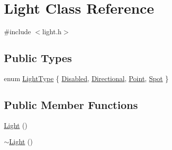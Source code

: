 \hypertarget{class_light}{}\section{Light Class Reference}
\label{class_light}


{\ttfamily \#include $<$light.\+h$>$}

\subsection*{Public Types}
\begin{DoxyCompactItemize}
\item 
enum \hyperlink{class_light_a661d9480e01af8b1612860b9630ef5f8}{Light\+Type} \{ \hyperlink{class_light_a661d9480e01af8b1612860b9630ef5f8a65021ca49102cf10ed4bd541e828ab6f}{Disabled}, 
\hyperlink{class_light_a661d9480e01af8b1612860b9630ef5f8ae1a0035e4acfd2e430ed27b591db4433}{Directional}, 
\hyperlink{class_light_a661d9480e01af8b1612860b9630ef5f8a95beda1310e6c8e76384dc8e60986ec2}{Point}, 
\hyperlink{class_light_a661d9480e01af8b1612860b9630ef5f8a909d110309169cdae833f32e84b297bf}{Spot}
 \}
\end{DoxyCompactItemize}
\subsection*{Public Member Functions}
\begin{DoxyCompactItemize}
\item 
\hyperlink{class_light_aeb5df09a25a32f19fdffa761268ba24f}{Light} ()
\item 
\hyperlink{class_light_ad0e59fad13bb6cfadc25b2c477e9ddc7}{$\sim$\+Light} ()
\end{DoxyCompactItemize}
